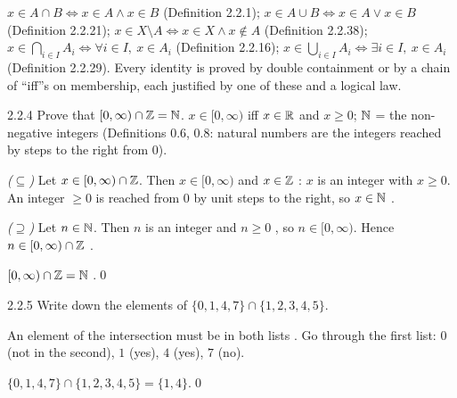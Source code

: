 
\begin{key}
$x\in A\cap B\Leftrightarrow x\in A\wedge x\in B$ (Definition 2.2.1); $x\in A\cup B\Leftrightarrow x\in A\vee x\in B$ (Definition 2.2.21); $x\in X\setminus A\Leftrightarrow x\in X\wedge x\notin A$ (Definition 2.2.38); $x\in\bigcap_{i\in I}A_i\Leftrightarrow\forall i\in I,\ x\in A_i$ (Definition 2.2.16); $x\in\bigcup_{i\in I}A_i\Leftrightarrow\exists i\in I,\ x\in A_i$ (Definition 2.2.29). Every identity is proved by double containment or by a chain of ``iff''s on membership, each justified by one of these and a logical law.
\end{key}

\begin{bookex}[recommended]{2.2.4}
Prove that $[0,\infty)\cap\mathbb{Z}=\mathbb{N}$.
\solution
\given $x\in[0,\infty)$ iff $x\in\mathbb{R}$ and $x\ge0$; $\mathbb{N}$ = the non-negative integers (Definitions 0.6, 0.8: natural numbers are the integers reached by steps to the right from $0$).
\begin{steps}
\item \emph{($\subseteq$)} Let $x\in[0,\infty)\cap\mathbb{Z}$. Then $x\in[0,\infty)$ and $x\in\mathbb{Z}$ : $x$ is an integer with $x\ge0$. An integer $\ge0$ is reached from $0$ by unit steps to the right, so $x\in\mathbb{N}$ .
\item \emph{($\supseteq$)} Let $n\in\mathbb{N}$. Then $n$ is an integer  and $n\ge0$ , so $n\in[0,\infty)$. Hence $n\in[0,\infty)\cap\mathbb{Z}$ .
\end{steps}
\conclusion $[0,\infty)\cap\mathbb{Z}=\mathbb{N}$ .\qed
\end{bookex}

\begin{bookex}[essential]{2.2.5}
Write down the elements of $\{0,1,4,7\}\cap\{1,2,3,4,5\}$.
\solution
\begin{steps}
\item An element of the intersection must be in both lists . Go through the first list: $0$ (not in the second), $1$ (yes), $4$ (yes), $7$ (no).
\end{steps}
\answer $\{0,1,4,7\}\cap\{1,2,3,4,5\}=\{1,4\}$.\qed
\end{bookex}

